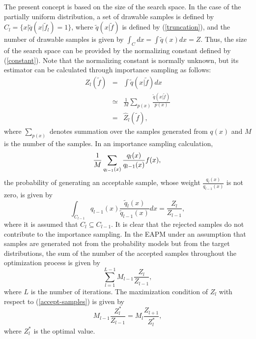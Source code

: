 The present concept is based on the size of the search space.
In the case of the partially uniform distribution,
a set of drawable samples is defined by 
\mbox{$C_l=\{x|\tilde q(x|\tilde f_l)=1\}$},
where $\tilde q(x|\tilde f)$ is defined by (\ref{truncation}),
and the number of drawable samples is given by
$
\int_C dx 
 = \int \tilde q(x) dx=Z
$.
Thus, the size of the search space can be provided by the
normalizing constant defined by (\ref{constant}).
Note that the normalizing constant is normally unknown,
but its estimator can be calculated through importance sampling as follows:
\begin{eqnarray}
Z_l(\tilde f) &=& \int \tilde q(x|\tilde f) dx \nonumber \\
 & \simeq & \frac{1}{M} \sum_{p(x)} \frac{\tilde q(x|\tilde
 f)}{p(x)} \nonumber \\
&=& \hat Z_l(\tilde f), \label{est-z}
\end{eqnarray}
where $\sum_{p(x)}$ denotes summation over the samples generated from
$q(x)$  and $M$ is the number of the samples.
In an importance sampling calculation,
\begin{equation}
\frac{1}{M}\sum_{{q_{l-1}(x)}} \frac{q_l(x)}{q_{l-1}(x)} f(x),\\
\end{equation}
the probability of generating an acceptable sample,
whose weight $\frac{q_{l}(x)}{q_{l-1}(x)}$ is not zero,
is given by 
\begin{equation}
 \int_{C_{l-1}} q_{l-1}(x) \frac{\tilde q_l(x)}{\tilde q_{l-1}(x)} dx=\frac{Z_l}{Z_{l-1}},
\end{equation}
where it is assumed that $C_l \subseteq C_{l-1}$.
It is clear that the rejected samples do not contribute
to the importance sampling.
In the EAPM under an assumption that samples are generated 
not from the probability models
but from the target distributions, 
the sum of the number of the accepted samples throughout the optimization
process
is given by
\begin{equation}
 \sum_{l=1}^{L-1} M_{l-1} \frac{Z_l}{Z_{l-1}},
\label{accept-samples}
\end{equation}
where $L$ is the number of iterations. 
The maximization condition of $Z_l$ with respect to
(\ref{accept-samples}) is given by
\begin{equation}
 M_{l-1}\frac{Z_l^*}{Z_{l-1}}=M_l \frac{Z_{l+1}}{Z_l^*},
\label{eq-tdc}
\end{equation}
where $Z_l^*$ is the optimal value.


